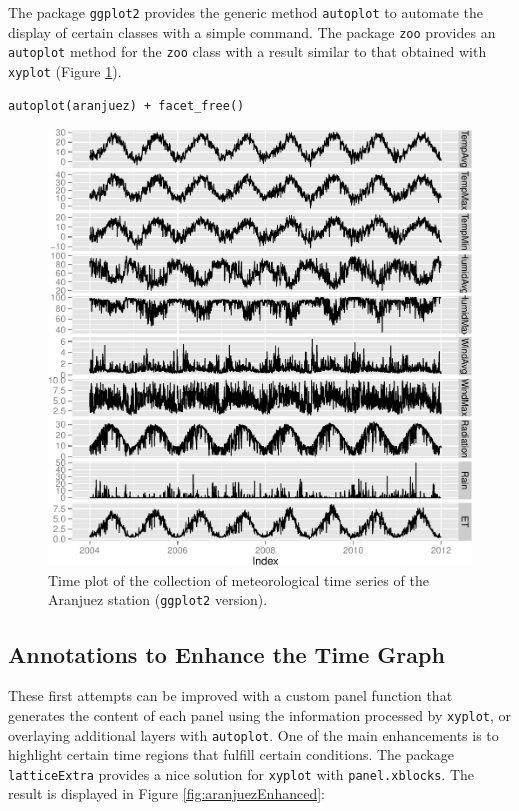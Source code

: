 The package \texttt{ggplot2} provides the generic method \texttt{autoplot} to
automate the display of certain classes with a simple command. The
package \texttt{zoo} provides an \texttt{autoplot} method for the \texttt{zoo} class with a
result similar to that obtained with \texttt{xyplot} (Figure \ref{fig:aranjuezNaiveGG}).

\lstset{language=R,numbers=none}
\begin{lstlisting}
autoplot(aranjuez) + facet_free()
\end{lstlisting}

\begin{figure}[htb]
\centering
\includegraphics[width=.9\linewidth]{figs/aranjuezGG.pdf}
\caption{\label{fig:aranjuezNaiveGG}Time plot of the collection of meteorological time series of the Aranjuez station (\texttt{ggplot2} version).}
\end{figure}

\subsection{\floweroneleft Annotations to Enhance the Time Graph}
\label{sec-1-1}

These first attempts can be improved with a custom panel function
that generates the content of each panel using the information
processed by \texttt{xyplot}, or overlaying additional layers with
\texttt{autoplot}.  One of the main enhancements is to highlight certain time
regions that fulfill certain conditions. The package \texttt{latticeExtra}
provides a nice solution for \texttt{xyplot} with \texttt{panel.xblocks}. The result
is displayed in Figure \ref{fig:aranjuezEnhanced}:

